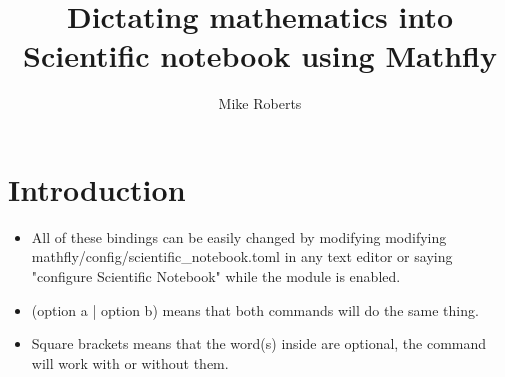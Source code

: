 \documentclass[12pt]{article}
\title{Dictating mathematics into Scientific notebook using Mathfly}
\author{Mike Roberts}
\begin{document}
\maketitle
\tableofcontents

\section{Introduction}
\begin{itemize}
\item All of these bindings can be easily changed by modifying modifying mathfly/config/scientific\_notebook.toml in any text editor or saying "configure Scientific Notebook" while the module is enabled.
\item (option a | option b) means that both commands will do the same thing.
\item Square brackets means that the word(s) inside are optional, the command will work with or without them.
\end{itemize}
\end{document}
